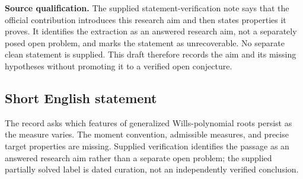 \documentclass[11pt]{article}
\begin{document}
\textbf{Source qualification.} The supplied statement-verification note says that the official contribution introduces this research aim and then states properties it proves. It identifies the extraction as an answered research aim, not a separately posed open problem, and marks the statement as unrecoverable. No separate clean statement is supplied. This draft therefore records the aim and its missing hypotheses without promoting it to a verified open conjecture.
\subsection{Short English statement}
The record asks which features of generalized Wills-polynomial roots persist as the measure varies. The moment convention, admissible measures, and precise target properties are missing. Supplied verification identifies the passage as an answered research aim rather than a separate open problem; the supplied partially solved label is dated curation, not an independently verified conclusion.
\end{document}
